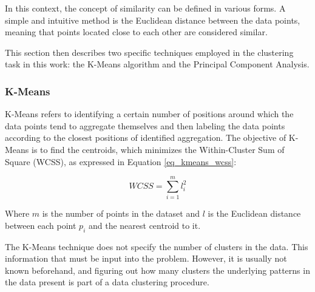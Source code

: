 \documentclass[conference]{IEEEtran}
\begin{document}
In this context, the concept of similarity can be defined in various forms. A simple and intuitive method is the Euclidean distance between the data points, meaning that points located close to each other are considered similar.

This section then describes two specific techniques employed in the clustering task in this work: the K-Means algorithm and the Principal Component Analysis.

\subsubsection{K-Means}

K-Means refers to identifying a certain number of positions around which the data points tend to aggregate themselves and then labeling the data points according to the closest positions of identified aggregation. The objective of K-Means is to find the centroids, which minimizes the Within-Cluster Sum of Square (WCSS), as expressed in Equation \ref{eq_kmeans_wcss}: 


\begin{equation}
	\label{eq_kmeans_wcss}
	WCSS=\sum_{i = 1}^{m} l_{i}^{2}
\end{equation}

Where $m$ is the number of points in the dataset and $l$ is the Euclidean distance between each point $p_{i}$ and the nearest centroid to it. %




The K-Means technique does not specify the number of clusters in the data. This information that must be input into the problem. However, it is usually not known beforehand, and figuring out how many clusters the underlying patterns in the data present is part of a data clustering procedure. %
\end{document}
